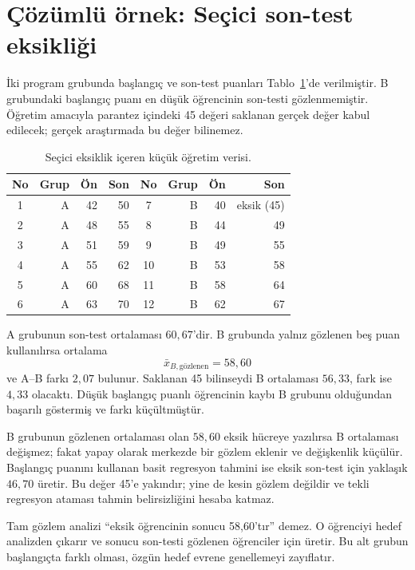 \section{Çözümlü örnek: Seçici son-test eksikliği}

İki program grubunda başlangıç ve son-test puanları Tablo~\ref{tab:missing-small-data}'de
verilmiştir. B grubundaki başlangıç puanı en düşük öğrencinin son-testi
gözlenmemiştir. Öğretim amacıyla parantez içindeki 45 değeri saklanan gerçek
değer kabul edilecek; gerçek araştırmada bu değer bilinemez.

\begin{table}[htbp]
\centering
\caption{Seçici eksiklik içeren küçük öğretim verisi.}
\label{tab:missing-small-data}
\begin{tabular}{@{}crrr@{\qquad}crrr@{}}
\toprule
No & Grup & Ön & Son & No & Grup & Ön & Son \\
\midrule
1&A&42&50 & 7&B&40&eksik (45)\\
2&A&48&55 & 8&B&44&49\\
3&A&51&59 & 9&B&49&55\\
4&A&55&62 &10&B&53&58\\
5&A&60&68 &11&B&58&64\\
6&A&63&70 &12&B&62&67\\
\bottomrule
\end{tabular}
\end{table}

A grubunun son-test ortalaması $60{,}67$'dir. B grubunda yalnız gözlenen beş
puan kullanılırsa ortalama
\[
\bar x_{B,\mathrm{gözlenen}}=58{,}60
\]
ve A--B farkı $2{,}07$ bulunur. Saklanan 45 bilinseydi B ortalaması $56{,}33$,
fark ise $4{,}33$ olacaktı. Düşük başlangıç puanlı öğrencinin kaybı B grubunu
olduğundan başarılı göstermiş ve farkı küçültmüştür.

B grubunun gözlenen ortalaması olan $58{,}60$ eksik hücreye yazılırsa B
ortalaması değişmez; fakat yapay olarak merkezde bir gözlem eklenir ve
değişkenlik küçülür. Başlangıç puanını kullanan basit regresyon tahmini ise
eksik son-test için yaklaşık $46{,}70$ üretir. Bu değer 45'e yakındır; yine de
kesin gözlem değildir ve tekli regresyon ataması tahmin belirsizliğini hesaba
katmaz.

\begin{ornek}
Tam gözlem analizi ``eksik öğrencinin sonucu 58,60'tır'' demez. O öğrenciyi
hedef analizden çıkarır ve sonucu son-testi gözlenen öğrenciler için üretir.
Bu alt grubun başlangıçta farklı olması, özgün hedef evrene genellemeyi
zayıflatır.
\end{ornek}

